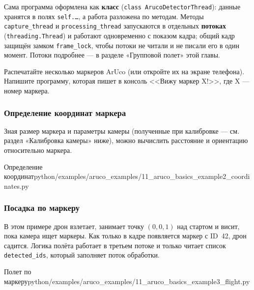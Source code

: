 Сама программа оформлена как \textbf{класс} (\texttt{class ArucoDetectorThread}): данные хранятся в полях \texttt{self.\dots}, а работа разложена по методам. Методы \texttt{capture\_thread} и \texttt{processing\_thread} запускаются в отдельных \textbf{потоках} (\texttt{threading.Thread}) и работают одновременно с показом кадра; общий кадр защищён замком \texttt{frame\_lock}, чтобы потоки не читали и не писали его в один момент. Потоки подробнее --- в разделе «Групповой полет» этой главы.

\begin{taskbox}
Распечатайте несколько маркеров ArUco (или откройте их на экране телефона). Напишите программу, которая пишет в консоль <<Вижу маркер X!>>, где X — номер маркера.
\end{taskbox}

\subsubsection*{Определение координат маркера}
Зная размер маркера и параметры камеры (полученные при калибровке --- см. раздел «Калибровка камеры» ниже), можно вычислить расстояние и ориентацию относительно маркера.

\begin{codefiletitle}[python]{Определение координат}{python/examples/aruco_examples/11_aruco_basics_example2_coordinates.py}
\end{codefiletitle}

\subsubsection*{Посадка по маркеру}
В этом примере дрон взлетает, занимает точку $(0, 0, 1)$ над стартом и висит, пока камера ищет маркеры. Как только в кадре появляется маркер с ID~42, дрон садится. Логика полёта работает в третьем потоке и только читает список \texttt{detected\_ids}, который заполняет поток обработки.

\begin{codefiletitle}[python]{Полет по маркеру}{python/examples/aruco_examples/11_aruco_basics_example3_flight.py}
\end{codefiletitle}
